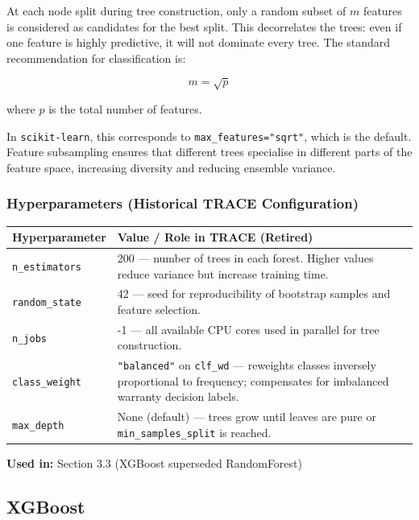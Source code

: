 \documentclass[10pt]{article}
\begin{document}
At each node split during tree construction, only a random subset of \(m\) features is considered as candidates for the best split. This decorrelates the trees: even if one feature is highly predictive, it will not dominate every tree. The standard recommendation for classification is:

\begin{equation}
m = \sqrt{p}
\end{equation}

where \(p\) is the total number of features.

In \texttt{scikit-learn}, this corresponds to \texttt{max\_features="sqrt"}, which is the default. Feature subsampling ensures that different trees specialise in different parts of the feature space, increasing diversity and reducing ensemble variance.

\subsubsection{Hyperparameters (Historical TRACE Configuration)}

\begin{table}[h!]
\centering
\begin{tabular}{|p{4cm}|p{9cm}|}
\hline
\textbf{Hyperparameter} & \textbf{Value / Role in TRACE (Retired)} \\ \hline
\texttt{n\_estimators} & 200 --- number of trees in each forest. Higher values reduce variance but increase training time. \\ \hline
\texttt{random\_state} & 42 --- seed for reproducibility of bootstrap samples and feature selection. \\ \hline
\texttt{n\_jobs} & -1 --- all available CPU cores used in parallel for tree construction. \\ \hline
\texttt{class\_weight} & \texttt{"balanced"} on \texttt{clf\_wd} --- reweights classes inversely proportional to frequency; compensates for imbalanced warranty decision labels. \\ \hline
\texttt{max\_depth} & None (default) --- trees grow until leaves are pure or \texttt{min\_samples\_split} is reached. \\ \hline
\end{tabular}
\end{table}

\textbf{Used in:} Section 3.3 (XGBoost superseded RandomForest)

\subsection{XGBoost}
\end{document}
